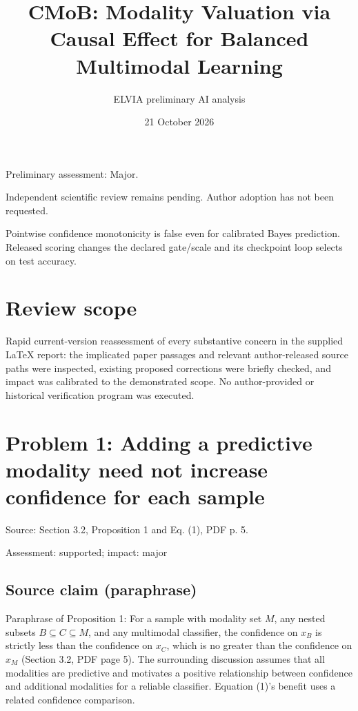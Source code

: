 \documentclass[11pt]{article}
\begin{document}
\title{CMoB: Modality Valuation via Causal Effect for Balanced Multimodal Learning}

\author{ELVIA preliminary AI analysis}\date{21 October 2026}\maketitle

Preliminary assessment: Major.\par

Independent scientific review remains pending. Author adoption has not been requested.

Pointwise confidence monotonicity is false even for calibrated Bayes prediction. Released scoring changes the declared gate/scale and its checkpoint loop selects on test accuracy.

\section*{Review scope}

Rapid current-version reassessment of every substantive concern in the supplied LaTeX report: the implicated paper passages and relevant author-released source paths were inspected, existing proposed corrections were briefly checked, and impact was calibrated to the demonstrated scope. No author-provided or historical verification program was executed.

\section*{Problem 1: Adding a predictive modality need not increase confidence for each sample}

Source: Section 3.2, Proposition 1 and Eq. (1), PDF p. 5.

Assessment: supported; impact: major

\subsection*{Source claim (paraphrase)}

Paraphrase of Proposition 1: For a sample with modality set \(M\), any nested subsets \(B\subseteq C\subseteq M\), and any multimodal classifier, the confidence on \(x_B\) is strictly less than the confidence on \(x_C\), which is no greater than the confidence on \(x_M\) (Section 3.2, PDF page 5). The surrounding discussion assumes that all modalities are predictive and motivates a positive relationship between confidence and additional modalities for a reliable classifier. Equation (1)’s benefit uses a related confidence comparison.
\end{document}
